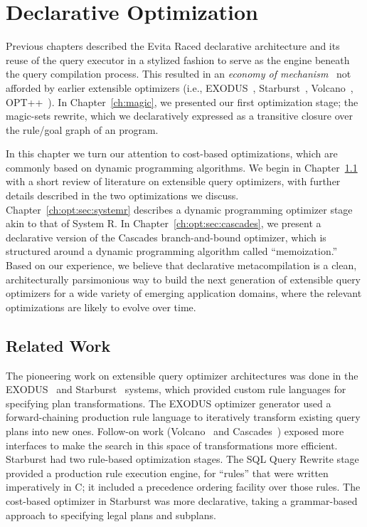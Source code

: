 \chapter[Declarative Optimization]{Declarative Optimization}
\label{ch:opt}

Previous chapters described the Evita Raced declarative architecture and its
reuse of the query executor in a stylized fashion to serve as the engine
beneath the query compilation process.  This resulted in an {\em economy of
mechanism}~\cite{Saltzer75theprotection} not afforded by earlier extensible
optimizers (i.e., EXODUS~\cite{exodus}, Starburst~\cite{phh92},
Volcano~\cite{volcano}, OPT++~\cite{opt++}).  In Chapter~\ref{ch:magic}, we
presented our first optimization stage; the magic-sets rewrite, which we
declaratively expressed as a transitive closure over the rule/goal graph of an
\OVERLOG program.

In this chapter we turn our attention to cost-based optimizations, which are
commonly based on dynamic programming algorithms.  We begin in
Chapter~\ref{ch:opt:sec:related} with a short review of literature on
extensible query optimizers, with further details described in the two
optimizations we discuss.  Chapter~\ref{ch:opt:sec:systemr} describes a dynamic
programming optimizer stage akin to that of System R.  In
Chapter~\ref{ch:opt:sec:cascades}, we present a declarative version of the
Cascades branch-and-bound optimizer, which is structured around a dynamic
programming algorithm called ``memoization.'' Based on our experience, we
believe that declarative metacompilation is a clean, architecturally
parsimonious way to build the next generation of extensible query optimizers
for a wide variety of emerging application domains, where the relevant
optimizations are likely to evolve over time.  

\section{Related Work}
\label{ch:opt:sec:related}

The pioneering work on extensible query optimizer architectures was done in the
EXODUS~\cite{exodus} and Starburst~\cite{lohman,phh92} systems, which provided
custom rule languages for specifying plan transformations.  The EXODUS
optimizer generator used a forward-chaining production rule language to iteratively
transform existing query plans into new ones.  Follow-on work
(Volcano~\cite{volcano} and Cascades~\cite{cascades}) exposed more interfaces
to make the search in this space of transformations more efficient.  Starburst
had two rule-based optimization stages.  The SQL Query Rewrite stage provided a
production rule execution engine, for ``rules'' that were written imperatively
in C; it included a precedence ordering facility over those rules.  The
cost-based optimizer in Starburst was more declarative, taking a grammar-based
approach to specifying legal plans and subplans.


